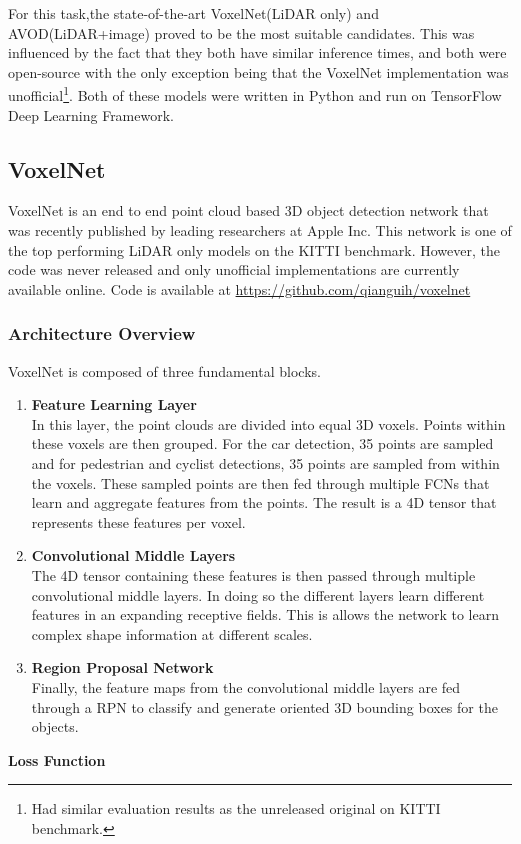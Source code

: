 For this task,the state-of-the-art VoxelNet(LiDAR only) and AVOD(LiDAR+image) proved to be the most suitable candidates. This was influenced by the fact that they both have similar inference times, and both were open-source with the only exception being that the VoxelNet implementation was unofficial\footnote{Had similar evaluation results as the unreleased original on KITTI benchmark.}. Both of these models were written in Python and run on TensorFlow Deep Learning Framework.

\subsection{VoxelNet}
VoxelNet is an end to end point cloud based 3D object detection network that was recently published by leading researchers at Apple Inc. This network is one of the top performing LiDAR only models on the KITTI benchmark. However, the code was never released and only unofficial implementations are currently available online.
Code is available at \url{https://github.com/qianguih/voxelnet}
\subsubsection{Architecture Overview}
VoxelNet is composed of three fundamental blocks. 
\begin{enumerate}
	\item \textbf{Feature Learning Layer} \\ 
	In this layer, the point clouds are divided into equal 3D voxels. Points within these voxels are then grouped. For the car detection, 35 points are sampled and for pedestrian and cyclist detections, 35 points are sampled from within the voxels. These sampled points are then fed through multiple FCNs that learn and aggregate features from the points. The result is a 4D tensor that represents these features per voxel.
	
	\item \textbf{Convolutional Middle Layers} \\ 
	The 4D tensor containing these features is then passed through multiple convolutional middle layers. In doing so the different layers learn different features in an expanding receptive fields. This is allows the network to learn complex shape information at different scales. 
	\item \textbf{Region Proposal Network} \\ 
	Finally, the feature maps from the convolutional middle layers are fed through a RPN to classify and generate  oriented 3D bounding boxes for the objects. 
	
\end{enumerate}
\noindent
\textbf{Loss Function} 

